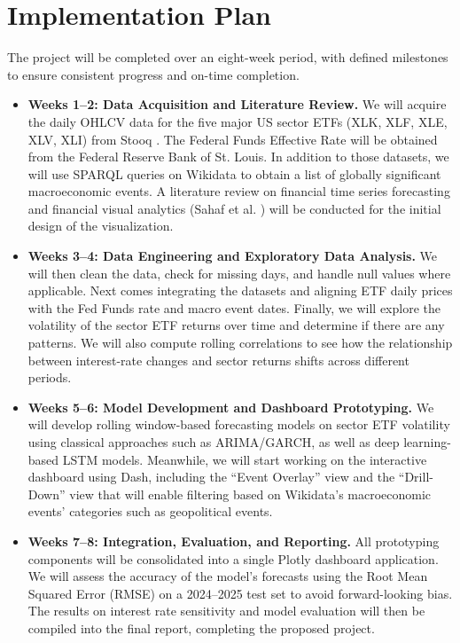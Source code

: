 \documentclass{article}
\begin{document}
\section{Implementation Plan}
The project will be completed over an eight-week period, with defined milestones to ensure consistent progress and on-time completion.

\begin{itemize}
    \item \textbf{Weeks 1–2: Data Acquisition and Literature Review.} 
    We will acquire the daily OHLCV data for the five major US sector ETFs (XLK, XLF, XLE, XLV, XLI) from Stooq \cite{stooq}. The Federal Funds Effective Rate will be obtained from the Federal Reserve Bank of St. Louis. In addition to those datasets, we will use SPARQL queries on Wikidata \cite{wikidata} to obtain a list of globally significant macroeconomic events. A literature review on financial time series forecasting and financial visual analytics (Sahaf et al. \cite{sahaf2017}) will be conducted for the initial design of the visualization.

    \item \textbf{Weeks 3–4: Data Engineering and Exploratory Data Analysis.} 
    We will then clean the data, check for missing days, and handle null values where applicable. Next comes integrating the datasets and aligning ETF daily prices with the Fed Funds rate and macro event dates. Finally, we will explore the volatility of the sector ETF returns over time and determine if there are any patterns. We will also compute rolling correlations to see how the relationship between interest-rate changes and sector returns shifts across different periods.

    \item \textbf{Weeks 5–6: Model Development and Dashboard Prototyping.} 
    We will develop rolling window-based forecasting models on sector ETF volatility using classical approaches such as ARIMA/GARCH, as well as deep learning-based LSTM models. Meanwhile, we will start working on the interactive dashboard using Dash, including the ``Event Overlay'' view and the ``Drill-Down'' view that will enable filtering based on Wikidata's macroeconomic events' categories such as geopolitical events.

    \item \textbf{Weeks 7--8: Integration, Evaluation, and Reporting.}
    All prototyping components will be consolidated into a single Plotly dashboard application. We will assess the accuracy of the model's forecasts using the Root Mean Squared Error (RMSE) on a 2024--2025 test set to avoid forward-looking bias. The results on interest rate sensitivity and model evaluation will then be compiled into the final report, completing the proposed project.


\end{itemize}
\end{document}

